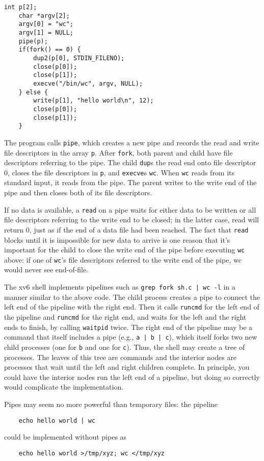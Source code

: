 \documentclass{report}
\begin{document}
	\begin{lstlisting}[style=c]
	int p[2];
	char *argv[2];
	argv[0] = "wc";
	argv[1] = NULL;
	pipe(p);
	if(fork() == 0) {
		dup2(p[0], STDIN_FILENO);
		close(p[0]);
		close(p[1]);
		execve("/bin/wc", argv, NULL);
	} else {
		write(p[1], "hello world\n", 12);
		close(p[0]);
		close(p[1]);
	}
	\end{lstlisting}
	
	The program calls \texttt{pipe}, which creates a new pipe and records the read and write file
	descriptors in the array \texttt{p}. After \texttt{fork}, both parent and child have file 
	descriptors referring to the pipe. The child \texttt{dup}s the read end onto file descriptor 0, 
	closes the file descriptors in \texttt{p}, and \texttt{execve}s \texttt{wc}. When \texttt{wc} reads 
	from its standard input, it reads from the
	pipe. The parent writes to the write end of the pipe and then closes both of its file
	descriptors.
	
	If no data is available, a \texttt{read} on a pipe waits for either data to be written or all
	file descriptors referring to the write end to be closed; in the latter case, read will 
	return 0, just as if the end of a data file had been reached. The fact that \texttt{read} blocks
	until it is impossible for new data to arrive is one reason that it's important for the
	child to close the write end of the pipe before executing \texttt{wc} above: if one of \texttt{wc}'s file
	descriptors referred to the write end of the pipe, wc would never see end-of-file.
	
	The xv6 shell implements pipelines such as \texttt{grep fork sh.c | wc -l} in a 
	manner similar to the above code. The child process creates a pipe to connect the
	left end of the pipeline with the right end. Then it calls \texttt{runcmd} for the left end of the
	pipeline and \texttt{runcmd} for the right end, and waits for the left and the right ends to 
	finish, by calling \texttt{waitpid} twice. The right end of the pipeline may be a command that itself
	includes a pipe (e.g., \texttt{a | b | c}), which itself forks two new child processes (one for \texttt{b}
	and one for \texttt{c}). Thus, the shell may create a tree of processes. The leaves of this tree
	are commands and the interior nodes are processes that wait until the left and right
	children complete. In principle, you could have the interior nodes run the left end of
	a pipeline, but doing so correctly would complicate the implementation.
	
	Pipes may seem no more powerful than temporary files: the pipeline
	\begin{lstlisting}
	echo hello world | wc
	\end{lstlisting}
	could be implemented without pipes as
	\begin{lstlisting}
	echo hello world >/tmp/xyz; wc </tmp/xyz
	\end{lstlisting}
	
\end{document}
